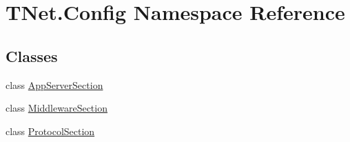 \hypertarget{namespace_t_net_1_1_config}{}\section{T\+Net.\+Config Namespace Reference}
\label{namespace_t_net_1_1_config}
\subsection*{Classes}
\begin{DoxyCompactItemize}
\item 
class \mbox{\hyperlink{class_t_net_1_1_config_1_1_app_server_section}{App\+Server\+Section}}
\item 
class \mbox{\hyperlink{class_t_net_1_1_config_1_1_middleware_section}{Middleware\+Section}}
\item 
class \mbox{\hyperlink{class_t_net_1_1_config_1_1_protocol_section}{Protocol\+Section}}
\end{DoxyCompactItemize}
